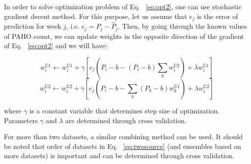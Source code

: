 In order to solve optimization problem of Eq. ~\ref{eq:opt2}, one can use stochastic gradient decent method. For this purpose, let us assume that $e_j$ is the error of prediction for week $j$, i.e. $e_j = P_j - \hat{P}_j$. Then, by going through the known values of PAHO count, we can update weights in the opposite direction of the gradient of Eq. ~\ref{eq:opt2} and we will have:

\begin{equation}
w_{i}^{\mathbb{D}1} \leftarrow w_{i}^{\mathbb{D}1}+ \gamma \left [e_j(P_i - b - (P_i - b) \sum_{k}{}{w_{i}^{\mathbb{D}2}}) + \lambda w_{i}^{\mathbb{D}1}  \right ]
\end{equation}
\begin{equation}
w_{i}^{\mathbb{D}2} \leftarrow w_{i}^{\mathbb{D}2}+ \gamma \left [e_j(P_i - b - \sum_{k}{}{(P_k - b)w_{k}^{\mathbb{D}1}}) + \lambda w_{i}^{\mathbb{D}2}  \right ]
\end{equation}

where $\gamma$ is a constant variable that determines step size of optimization. Parameters $\gamma$ and $\lambda$ are determined through cross validation.

For more than two datasets, a similar combining method can be used. It should be noted that order of datasets in Eq. ~\ref{eq:twosource} (and ensembles based on more datasets) is important and can be determined through cross validation.
